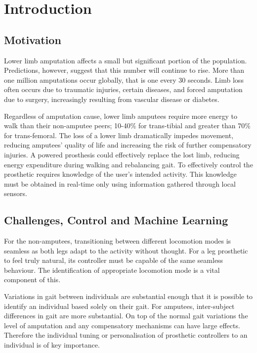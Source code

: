 \chapter{Introduction}
\label{chp:intro}

\section{Motivation}
Lower limb amputation affects a small but significant portion of the population. Predictions, however, suggest that this number will continue to rise. More than one million amputations occur globally, that is one every 30 seconds.\cite{Asif2021} Limb loss often occurs due to traumatic injuries, certain diseases, and forced amputation due to surgery, increasingly resulting from vascular disease or diabetes\cite{Griffin2012, Walter2022}.

Regardless of amputation cause, lower limb amputees require more energy to walk than their non-amputee peers\cite{Vllasolli2014}; 10-40\% for trans-tibial\cite{McDonald2018, Herr2012} and greater than 70\% for trans-femoral{\cite{Stewart2008}}. The loss of a lower limb dramatically impedes movement\cite{Gregg2014, Wong2021, Srisuwan2021}, reducing amputees' quality of life and increasing the risk of further compensatory injuries. A powered prosthesis could effectively replace the lost limb, reducing energy expenditure during walking and rebalancing gait\cite{Lin2014}. To effectively control the prosthetic requires knowledge of the user's intended activity. This knowledge must be obtained in real-time only using information gathered through local sensors.\cite{Tucker2015}

\section{Challenges, Control and Machine Learning}
For the non-amputees, transitioning between different locomotion modes is seamless as both legs adapt to the activity without thought. For a leg prosthetic to feel truly natural, its controller must be capable of the same seamless behaviour. The identification of appropriate locomotion mode is a vital component of this.

Variations in gait between individuals are substantial enough that it is possible to identify an individual based solely on their gait\cite{Zeng2021, Kwon2021}. For amputees, inter-subject differences in gait are more substantial. On top of the normal gait variations the level of amputation and any compensatory mechanisms can have large effects. Therefore the individual tuning or personalisation of prosthetic controllers to an individual is of key importance.

